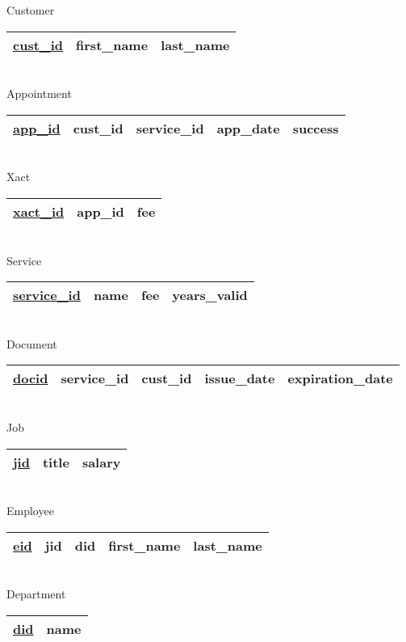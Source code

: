\documentclass[12pt]{article}
\newcommand{\ul}{\underline}
\begin{document}
\begin{center}
\begin{minipage}{0.5\linewidth}
Customer
\begin{tabular}[l]{|c|c|c|}
	\hline
	\ul{cust\_id} &first\_name &last\_name\\
	\hline
\end{tabular}\\

Appointment
\begin{tabular}[l]{|c|c|c|c|c|}
	\hline
	\ul{app\_id} &cust\_id &service\_id &app\_date &success\\
	\hline
\end{tabular}\\

Xact
\begin{tabular}[l]{|c|c|c|}
	\hline
	\ul{xact\_id} &app\_id &fee\\
	\hline
\end{tabular}\\

Service
\begin{tabular}[l]{|c|c|c|c|}
	\hline
	\ul{service\_id} &name &fee &years\_valid\\
	\hline
\end{tabular}\\

Document
\begin{tabular}[l]{|c|c|c|c|c|}
	\hline
	\ul{docid} &service\_id &cust\_id &issue\_date &expiration\_date\\
	\hline
\end{tabular}\\

Job
\begin{tabular}[l]{|c|c|c|}
	\hline
	\ul{jid} &title &salary\\
	\hline
\end{tabular}\\

Employee
\begin{tabular}[l]{|c|c|c|c|c|}
	\hline
	\ul{eid} &jid &did &first\_name &last\_name\\
	\hline
\end{tabular}\\

Department
\begin{tabular}[l]{|c|c|}
	\hline
	\ul{did} &name\\
	\hline
\end{tabular}

\end{minipage}
\end{center}
\end{document}
